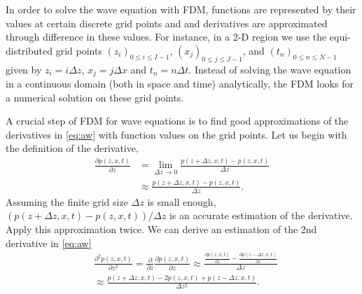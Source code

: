 \documentclass[11pt]{article}
\theoremstyle{plain}
\theoremstyle{definition}
\theoremstyle{remark}
\numberwithin{equation}{section}
\begin{document}
In order to solve the wave equation with FDM, functions are represented by their values at certain discrete grid points and and derivatives are approximated through difference in these values. For instance, in a 2-D region we use the equi-distributed grid points $(z_i)_{0\le i \le I-1 }$, $(x_j)_{0\le j \le J-1}$, and $(t_n)_{0\le n \le N-1}$ given by $z_i = i\Delta z$, $x_j = j\Delta x$ and $t_n=n\Delta t$. Instead of solving the wave equation in a continuous domain (both in space and time) analytically, the FDM looks for a numerical solution on these grid points.  

A crucial step of FDM for wave equations is to find good approximations of the derivatives in \eqref{eq:aw} with function values on the grid points. Let us begin with the definition of the derivative, 
 \begin{equation}
  \begin{aligned}
  \frac{\partial p(z, x, t)}{\partial z} &= \lim\limits_{\Delta z \rightarrow 0} \frac{p(z+\Delta z, x, t) - p(z, x, t)}{\Delta z}\\
  &\approx \frac{p(z+\Delta z, x, t) - p(z, x, t)}{\Delta z}.
  \end{aligned}
  \end{equation}
 Assuming the finite grid size $\Delta z$ is small enough, $(p(z+\Delta z, x, t) - p(z, x, t))/\Delta z$ is an accurate estimation of the derivative.
  Apply this approximation twice. We can derive an estimation of the 2nd derivative in \eqref{eq:aw}
  \begin{equation}
  \begin{aligned}
  &\frac{\partial^2 p(z, x, t)}{\partial z^2} = \frac{\partial}{\partial z}\frac{\partial p(z, x, t)}{\partial z} \approx \frac{\frac{\partial p(z, x, t)}{\partial z} - \frac{\partial p(z-\Delta z, x, t)}{\partial z}}{\Delta z}\\
  &\approx \frac{p(z+\Delta z, x, t) - 2p(z, x, t) + p(z-\Delta z, x, t)}{\Delta z^2}.
  \end{aligned}
  \end{equation}
  
\end{document}
